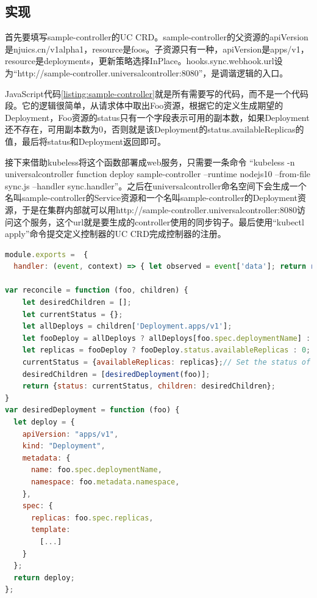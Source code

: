 \documentclass[macfonts,master]{njuthesis}
\begin{document}
\subsection{实现}

首先要填写sample-controller的UC CRD。sample-controller的父资源的apiVersion是njuics.cn/v1alpha1，resource是foos。子资源只有一种，apiVersion是apps/v1，resource是deployments，更新策略选择InPlace。hooks.sync.webhook.url设为``http://sample-controller.universalcontroller:8080''，是调谐逻辑的入口。

JavaScript代码\ref{listing:sample-controller}就是所有需要写的代码，而不是一个代码段。它的逻辑很简单，从请求体中取出Foo资源，根据它的定义生成期望的Deployment，Foo资源的status只有一个字段表示可用的副本数，如果Deployment还不存在，可用副本数为0，否则就是该Deployment的status.availableReplicas的值，最后将status和Deployment返回即可。

接下来借助kubeless将这个函数部署成web服务，只需要一条命令
``kubeless -n universalcontroller function deploy sample-controller --runtime nodejs10 --from-file sync.js --handler sync.handler''。之后在universalcontroller命名空间下会生成一个名叫sample-controller的Service资源和一个名叫sample-controller的Deployment资源，于是在集群内部就可以用http://sample-controller.universalcontroller:8080访问这个服务，这个url就是要生成的controller使用的同步钩子。最后使用``kubectl apply''命令提交定义控制器的UC CRD完成控制器的注册。

\begin{lstlisting}[language=JavaScript,caption=sample-controller的实现代码,label=listing:sample-controller]
module.exports =  {
  handler: (event, context) => { let observed = event['data']; return reconcile(observed.parent, observed.children);} };

var reconcile = function (foo, children) {
    let desiredChildren = [];
    let currentStatus = {};
    let allDeploys = children['Deployment.apps/v1'];
    let fooDeploy = allDeploys ? allDeploys[foo.spec.deploymentName] : null;
    let replicas = fooDeploy ? fooDeploy.status.availableReplicas : 0;
    currentStatus = {availableReplicas: replicas};// Set the status of Foo
    desiredChildren = [desiredDeployment(foo)];
    return {status: currentStatus, children: desiredChildren};
}
var desiredDeployment = function (foo) {
  let deploy = {
    apiVersion: "apps/v1",
    kind: "Deployment",
    metadata: {
      name: foo.spec.deploymentName,
      namespace: foo.metadata.namespace,
    },
    spec: {
      replicas: foo.spec.replicas,
      template: 
      	[...]
    }
  };
  return deploy;
};
\end{lstlisting}
\end{document}
